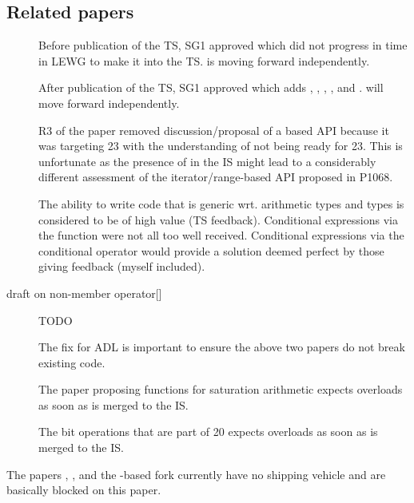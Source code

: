\subsection{Related papers}
\begin{description}
  \item[] Before publication of the TS, SG1 approved \cite{P0350R0} which did not progress in time in LEWG to make it into the TS.
     is moving forward independently.

  \item[] After publication of the TS, SG1 approved \cite{P0918R2} which adds , , , , and .
     will move forward independently.

  \item[] R3 of the paper removed discussion/proposal of a  based API because it was targeting \CC{}23 with the understanding of  not being ready for \CC{}23.
    This is unfortunate as the presence of  in the IS might lead to a considerably different assessment of the iterator/range-based API proposed in P1068.

  \item[] The ability to write code that is generic wrt. arithmetic types and  types is considered to be of high value (TS feedback).
    Conditional expressions via the  function were not all too well received.
    Conditional expressions via the conditional operator would provide a solution deemed perfect by those giving feedback (myself included).

  \item[draft on non-member {operator[]}] TODO

  \item[] The fix for ADL is important to ensure the above two papers do not break existing code.

  \item[] The paper proposing functions for saturation arithmetic expects  overloads as soon as  is merged to the IS.

  \item[] The bit operations that are part of \CC{}20 expects  overloads as soon as  is merged to the IS.

\end{description}
The papers , , and the -based  fork currently have no shipping vehicle and are basically blocked on this paper.

